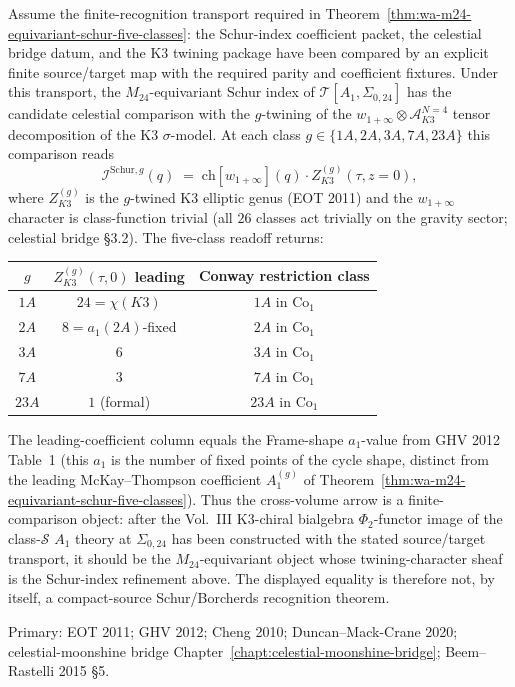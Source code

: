 \begin{remark}%
\label{rem:wa-classS-celestial}%
Assume the finite-recognition transport required in
Theorem~\ref{thm:wa-m24-equivariant-schur-five-classes}: the Schur-index
coefficient packet, the celestial bridge datum, and the K3 twining
package have been compared by an explicit finite source/target map with
the required parity and coefficient fixtures.  Under this transport, the
$M_{24}$-equivariant Schur index of $\mathcal T[A_1,\Sigma_{0, 24}]$
has the candidate celestial comparison with the $g$-twining of the
$w_{1+\infty} \otimes \mathcal A^{N=4}_{K3}$ tensor decomposition of the
K3 $\sigma$-model. At each class
$g \in \{1A, 2A, 3A, 7A, 23A\}$ this comparison reads
\[
 \mathcal I^{\mathrm{Schur}, g}(q)
 \;=\; \mathrm{ch}[w_{1+\infty}](q) \cdot
 Z_{K3}^{(g)}(\tau, z=0),
\]
where $Z_{K3}^{(g)}$ is the $g$-twined K3 elliptic genus
(EOT 2011) and the $w_{1+\infty}$ character is class-function
trivial (all $26$ classes act trivially on the gravity
sector; celestial bridge \S 3.2). The five-class readoff
returns:
\begin{center}
\begin{tabular}{c|c|c}
$g$ & $Z_{K3}^{(g)}(\tau, 0)$ leading & Conway restriction class \\\hline
$1A$ & $24 = \chi(K3)$ & $1A$ in $\mathrm{Co}_1$ \\
$2A$ & $8 = a_1(2A)$-fixed & $2A$ in $\mathrm{Co}_1$ \\
$3A$ & $6$ & $3A$ in $\mathrm{Co}_1$ \\
$7A$ & $3$ & $7A$ in $\mathrm{Co}_1$ \\
$23A$ & $1$ (formal) & $23A$ in $\mathrm{Co}_1$ \\
\end{tabular}
\end{center}
The leading-coefficient column equals the Frame-shape
$a_1$-value from GHV 2012 Table~1 (this $a_1$ is the number
of fixed points of the cycle shape, distinct from the
leading McKay--Thompson coefficient $A_1^{(g)}$ of
Theorem~\ref{thm:wa-m24-equivariant-schur-five-classes}).
Thus the cross-volume arrow is a finite-comparison object: after the
Vol.~III K3-chiral bialgebra $\Phi_2$-functor image of the
class-$\mathcal S$ $A_1$ theory at $\Sigma_{0, 24}$ has been constructed
with the stated source/target transport, it should be the
$M_{24}$-equivariant object whose twining-character sheaf is the
Schur-index refinement above.  The displayed equality is therefore not,
by itself, a compact-source Schur/Borcherds recognition theorem.

Primary: EOT 2011; GHV 2012; Cheng 2010;
Duncan--Mack-Crane 2020; celestial-moonshine bridge
Chapter~\ref{chapt:celestial-moonshine-bridge};
Beem--Rastelli 2015 \S 5.
\end{remark}
